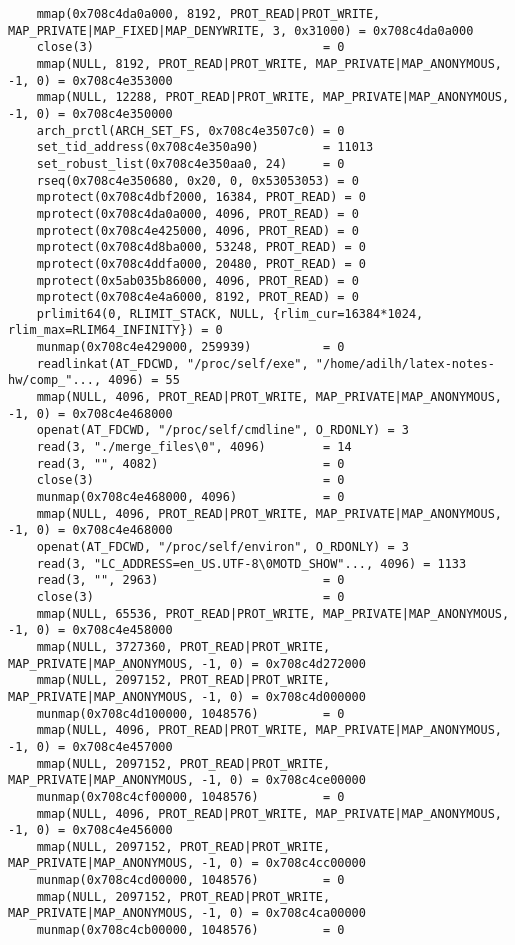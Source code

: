 \documentclass[12pt]{article}
\begin{document}
\begin{verbatim}
	mmap(0x708c4da0a000, 8192, PROT_READ|PROT_WRITE, MAP_PRIVATE|MAP_FIXED|MAP_DENYWRITE, 3, 0x31000) = 0x708c4da0a000
	close(3)                                = 0
	mmap(NULL, 8192, PROT_READ|PROT_WRITE, MAP_PRIVATE|MAP_ANONYMOUS, -1, 0) = 0x708c4e353000
	mmap(NULL, 12288, PROT_READ|PROT_WRITE, MAP_PRIVATE|MAP_ANONYMOUS, -1, 0) = 0x708c4e350000
	arch_prctl(ARCH_SET_FS, 0x708c4e3507c0) = 0
	set_tid_address(0x708c4e350a90)         = 11013
	set_robust_list(0x708c4e350aa0, 24)     = 0
	rseq(0x708c4e350680, 0x20, 0, 0x53053053) = 0
	mprotect(0x708c4dbf2000, 16384, PROT_READ) = 0
	mprotect(0x708c4da0a000, 4096, PROT_READ) = 0
	mprotect(0x708c4e425000, 4096, PROT_READ) = 0
	mprotect(0x708c4d8ba000, 53248, PROT_READ) = 0
	mprotect(0x708c4ddfa000, 20480, PROT_READ) = 0
	mprotect(0x5ab035b86000, 4096, PROT_READ) = 0
	mprotect(0x708c4e4a6000, 8192, PROT_READ) = 0
	prlimit64(0, RLIMIT_STACK, NULL, {rlim_cur=16384*1024, rlim_max=RLIM64_INFINITY}) = 0
	munmap(0x708c4e429000, 259939)          = 0
	readlinkat(AT_FDCWD, "/proc/self/exe", "/home/adilh/latex-notes-hw/comp_"..., 4096) = 55
	mmap(NULL, 4096, PROT_READ|PROT_WRITE, MAP_PRIVATE|MAP_ANONYMOUS, -1, 0) = 0x708c4e468000
	openat(AT_FDCWD, "/proc/self/cmdline", O_RDONLY) = 3
	read(3, "./merge_files\0", 4096)        = 14
	read(3, "", 4082)                       = 0
	close(3)                                = 0
	munmap(0x708c4e468000, 4096)            = 0
	mmap(NULL, 4096, PROT_READ|PROT_WRITE, MAP_PRIVATE|MAP_ANONYMOUS, -1, 0) = 0x708c4e468000
	openat(AT_FDCWD, "/proc/self/environ", O_RDONLY) = 3
	read(3, "LC_ADDRESS=en_US.UTF-8\0MOTD_SHOW"..., 4096) = 1133
	read(3, "", 2963)                       = 0
	close(3)                                = 0
	mmap(NULL, 65536, PROT_READ|PROT_WRITE, MAP_PRIVATE|MAP_ANONYMOUS, -1, 0) = 0x708c4e458000
	mmap(NULL, 3727360, PROT_READ|PROT_WRITE, MAP_PRIVATE|MAP_ANONYMOUS, -1, 0) = 0x708c4d272000
	mmap(NULL, 2097152, PROT_READ|PROT_WRITE, MAP_PRIVATE|MAP_ANONYMOUS, -1, 0) = 0x708c4d000000
	munmap(0x708c4d100000, 1048576)         = 0
	mmap(NULL, 4096, PROT_READ|PROT_WRITE, MAP_PRIVATE|MAP_ANONYMOUS, -1, 0) = 0x708c4e457000
	mmap(NULL, 2097152, PROT_READ|PROT_WRITE, MAP_PRIVATE|MAP_ANONYMOUS, -1, 0) = 0x708c4ce00000
	munmap(0x708c4cf00000, 1048576)         = 0
	mmap(NULL, 4096, PROT_READ|PROT_WRITE, MAP_PRIVATE|MAP_ANONYMOUS, -1, 0) = 0x708c4e456000
	mmap(NULL, 2097152, PROT_READ|PROT_WRITE, MAP_PRIVATE|MAP_ANONYMOUS, -1, 0) = 0x708c4cc00000
	munmap(0x708c4cd00000, 1048576)         = 0
	mmap(NULL, 2097152, PROT_READ|PROT_WRITE, MAP_PRIVATE|MAP_ANONYMOUS, -1, 0) = 0x708c4ca00000
	munmap(0x708c4cb00000, 1048576)         = 0

\end{verbatim}
\end{document}
